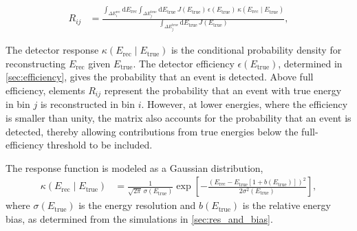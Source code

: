 \documentclass[main.tex]{subfiles}
\begin{document}
\begin{align}
R_{ij}
&=
\frac{
    \displaystyle
    \int_{\Delta E_i^{\mathrm{rec}}} \mathrm{d}E_{\mathrm{rec}}
    \int_{\Delta E_j^{\mathrm{true}}} \mathrm{d}E_{\mathrm{true}}\,
    J(E_{\mathrm{true}})\,\epsilon(E_{\mathrm{true}})\,
    \kappa(E_{\mathrm{rec}}\mid E_{\mathrm{true}})
}{
    \displaystyle
    \int_{\Delta E_j^{\mathrm{true}}}
    \mathrm{d}E_{\mathrm{true}}\,J(E_{\mathrm{true}})
},
\label{eq:migration_matrix}
\end{align}

The detector response $\kappa(E_{\mathrm{rec}}\mid E_{\mathrm{true}})$ is the conditional probability density for reconstructing $E_{\mathrm{rec}}$ given $E_{\mathrm{true}}$.
The detector efficiency $\epsilon(E_{\mathrm{true}})$, determined in \cref{sec:efficiency}, gives the probability that an event is detected.
Above full efficiency, elements $R_{ij}$ represent the probability that an event with true energy in bin $j$ is reconstructed in bin $i$.
However, at lower energies, where the efficiency is smaller than unity, the matrix also accounts for the probability that an event is detected, thereby allowing contributions from true energies below the full-efficiency threshold to be included.

The response function is modeled as a Gaussian distribution,
\begin{align}
    \kappa(E_{\mathrm{rec}}\mid E_{\mathrm{true}})
    &=
    \frac{1}{\sqrt{2\pi}\,\sigma(E_{\mathrm{true}})}
    \exp\left[
        -\frac{
            \left(
                E_{\mathrm{rec}}-E_{\mathrm{true}}
                \left[1+b(E_{\mathrm{true}})\right]
            \right)^2
        }{
            2\sigma^2(E_{\mathrm{true}})
        }
    \right],
    \label{eq:resolution_function}
\end{align}
where $\sigma(E_{\mathrm{true}})$ is the energy resolution and $b(E_{\mathrm{true}})$ is the relative energy bias, as determined from the simulations in \cref{sec:res_and_bias}.
\end{document}
